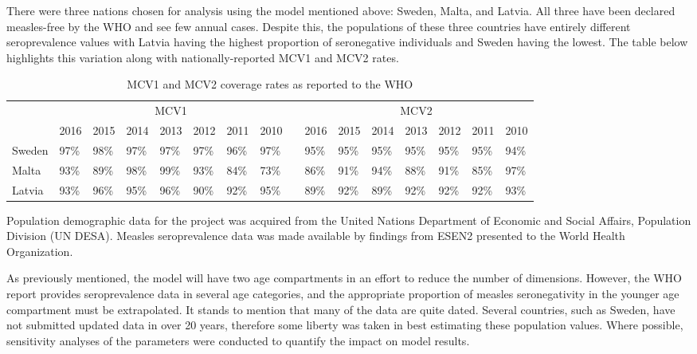 \documentclass[../Paper.tex]{subfiles}
\begin{document}
\justifying
There were three nations chosen for analysis using the model mentioned above:
Sweden, Malta, and Latvia. All three have been declared measles-free by the WHO
and see few annual cases. Despite this, the populations of these three countries
have entirely different seroprevalence values with Latvia having the highest
proportion of seronegative individuals and Sweden having the lowest.
The table below highlights this variation along with nationally-reported MCV1 and MCV2 rates.
\begin{table}[htbp]
\centering
\label{my-label}
\begin{tabular}{@{}lllllllllllllllll@{}}
\multicolumn{2}{l}{\multirow{2}{*}{}} & \multicolumn{7}{c}{MCV1} &  & \multicolumn{7}{c}{MCV2} \\ \cmidrule(lr){3-9} \cmidrule(l){11-17}
\multicolumn{2}{l}{} & 2016 & 2015 & 2014 & 2013 & 2012 & 2011 & 2010 &  & 2016 & 2015 & 2014 & 2013 & 2012 & 2011 & 2010 \\ \cmidrule(r){1-17}
\multicolumn{2}{l}{Sweden} & 97\% & 98\% & 97\% & 97\% & 97\% & 96\% & 97\% &  & 95\% & 95\% & 95\% & 95\% & 95\% & 95\% & 94\% \\
\multicolumn{2}{l}{Malta} & 93\% & 89\% & 98\% & 99\% & 93\% & 84\% & 73\% &  & 86\% & 91\% & 94\% & 88\% & 91\% & 85\% & 97\% \\
\multicolumn{2}{l}{Latvia} & 93\% & 96\% & 95\% & 96\% & 90\% & 92\% & 95\% &  & 89\% & 92\% & 89\% & 92\% & 92\% & 92\% & 93\% \\ \bottomrule
\end{tabular}
\caption{MCV1 and MCV2 coverage rates as reported to the WHO \cite{world_health_organization_table}}
\end{table}


Population demographic data for the project was acquired from the United Nations
Department of Economic and Social Affairs, Population Division (UN DESA). Measles
seroprevalence data was made available by findings from ESEN2 presented to the World
Health Organization.

As previously mentioned, the model will have two age compartments in an effort to
reduce the number of dimensions. However, the WHO report provides seroprevalence data
in several age categories, and the appropriate proportion of measles seronegativity
in the younger age compartment must be extrapolated. It stands to mention that
many of the data are quite dated.
Several countries, such as Sweden, have not submitted updated data in over 20 years,
therefore some liberty was taken in best estimating these population values.
Where possible, sensitivity analyses of the parameters were conducted to
quantify the impact on model results.



\clearpage
\end{document}
